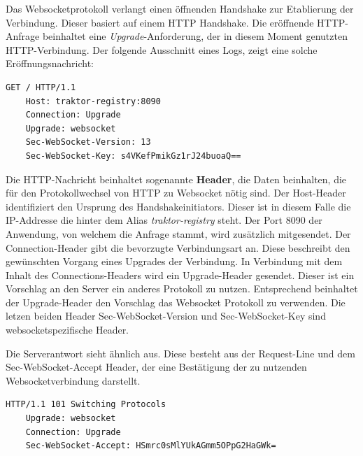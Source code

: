 Das Websocketprotokoll verlangt einen öffnenden Handshake zur Etablierung der Verbindung. Dieser basiert auf einem HTTP Handshake. Die eröffnende HTTP-Anfrage beinhaltet eine \emph{Upgrade}-Anforderung, der in diesem Moment genutzten HTTP-Verbindung. Der folgende Ausschnitt eines Logs, zeigt eine solche Eröffnungsnachricht:

\begin{minipage}[]{\textwidth}
	\begin{lstlisting}[frame=trBL]
	GET / HTTP/1.1
	Host: traktor-registry:8090
	Connection: Upgrade
	Upgrade: websocket
	Sec-WebSocket-Version: 13
	Sec-WebSocket-Key: s4VKefPmikGz1rJ24buoaQ==
	\end{lstlisting}
	\label{listing:Eröffnender Websocket Handshake}
\end{minipage} 

Die HTTP-Nachricht beinhaltet sogenannte \textbf{Header}, die Daten beinhalten, die für den Protokollwechsel von HTTP zu Websocket nötig sind. Der Host-Header identifiziert den Ursprung des Handshakeinitiators. Dieser ist in diesem Falle die IP-Addresse die hinter dem Alias \emph{traktor-registry} steht. Der Port 8090 der Anwendung, von welchem die Anfrage stammt, wird zusätzlich mitgesendet. Der Connection-Header gibt die bevorzugte Verbindungsart an. Diese beschreibt den gewünschten Vorgang eines Upgrades der Verbindung. In Verbindung mit dem Inhalt des Connections-Headers wird ein Upgrade-Header gesendet. Dieser ist ein Vorschlag an den Server ein anderes Protokoll zu nutzen. Entsprechend beinhaltet der Upgrade-Header den Vorschlag das Websocket Protokoll zu verwenden. Die letzen beiden Header Sec-WebSocket-Version und Sec-WebSocket-Key sind websocketspezifische Header.

Die Serverantwort sieht ähnlich aus. Diese besteht aus der Request-Line und dem Sec-WebSocket-Accept Header, der eine Bestätigung der zu nutzenden Websocketverbindung darstellt.

\begin{minipage}[]{\textwidth}
	\begin{lstlisting}[frame=trBL]
	HTTP/1.1 101 Switching Protocols
	Upgrade: websocket
	Connection: Upgrade
	Sec-WebSocket-Accept: HSmrc0sMlYUkAGmm5OPpG2HaGWk=
	\end{lstlisting}
	\label{listing:Serverantwort eines Websocket Handshake}
\end{minipage} 

